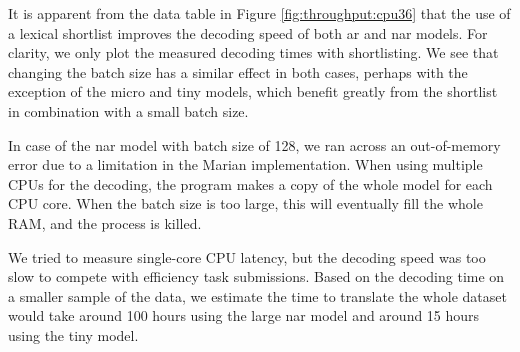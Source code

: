 It is apparent from the data table in Figure \ref{fig:throughput:cpu36} that
the use of a lexical shortlist improves the decoding speed of both \ac{ar} and
\ac{nar} models. For clarity, we only plot the measured decoding times with
shortlisting. We see that changing the batch size has a similar effect in both
cases, perhaps with the exception of the micro and tiny models, which benefit
greatly from the shortlist in combination with a small batch size.

In case of the \ac{nar} model with batch size of 128, we ran across an
out-of-memory error due to a limitation in the Marian implementation. When
using multiple CPUs for the decoding, the program makes a copy of the whole
model for each CPU core. When the batch size is too large, this will eventually
fill the whole RAM, and the process is killed.

We tried to measure single-core CPU latency, but the decoding speed was too
slow to compete with efficiency task submissions. Based on the decoding time on
a smaller sample of the data, we estimate the time to translate the whole
dataset would take around 100 hours using the large \ac{nar} model and around
15 hours using the tiny model.

